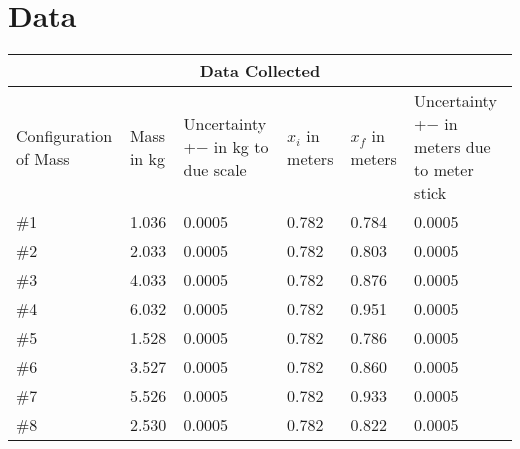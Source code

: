 {}
\chapter{Data}

\begin{tabular}{ |p{2cm}|p{2cm}|p{4cm}|p{2cm}|p{2cm}|p{3cm}| }
  \hline
  \multicolumn{6}{|c|}{Data Collected} \\
  \hline
  Configuration of Mass & Mass in kg & Uncertainty +$-$ in kg to due scale 
  & $x_i$ in meters & $x_f$ in meters & Uncertainty +$-$ in meters due to meter stick\\
  \hline
  \#1& 1.036 &  0.0005 & 0.782 & 0.784 & 0.0005\\
  \hline
  \#2& 2.033 &  0.0005 & 0.782 & 0.803 & 0.0005\\
  \hline
  \#3& 4.033 &  0.0005 & 0.782 & 0.876 & 0.0005\\
  \hline
  \#4& 6.032 &  0.0005 & 0.782 & 0.951 & 0.0005\\
  \hline
  \#5& 1.528 &  0.0005 & 0.782 & 0.786 & 0.0005\\
  \hline
  \#6& 3.527 &  0.0005 & 0.782 & 0.860 & 0.0005\\
  \hline
  \#7& 5.526 &  0.0005 & 0.782 & 0.933 & 0.0005\\
  \hline
  \#8& 2.530 &  0.0005 & 0.782 & 0.822 & 0.0005\\
  \hline
\end{tabular}

\restoregeometry